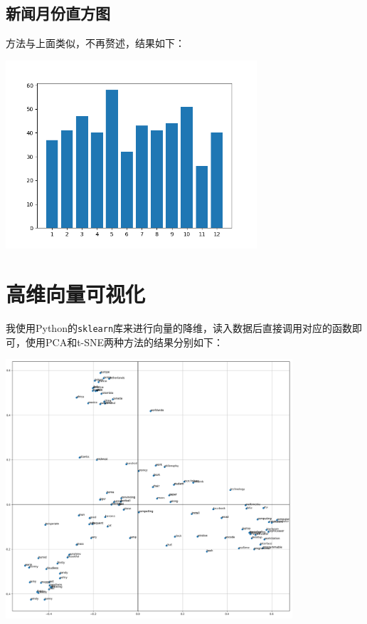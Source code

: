 \documentclass[12pt, UTF8]{article}
\begin{document}
\subsection{新闻月份直方图}
方法与上面类似，不再赘述，结果如下：

\begin{center}
  \includegraphics[width=0.7\textwidth]{month_hist.png}
\end{center}

\section{高维向量可视化}
我使用Python的\lstinline|sklearn|库来进行向量的降维，读入数据后直接调用对应的函数即可，使用PCA和t-SNE两种方法的结果分别如下：

\begin{center}
  \includegraphics[width=0.8\textwidth]{pca.png}
\end{center}
\end{document}
